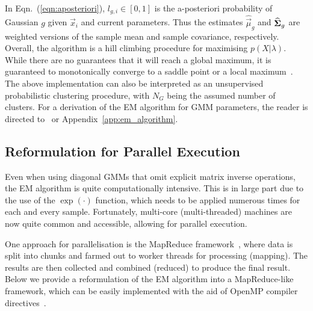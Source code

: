 \noindent In Eqn.~(\ref{eqn:aposteriori}), $l_{g,i} \in [0,1]$ is the {a-posteriori} probability of Gaussian $g$ given $\Vec{x}_i$ and current parameters.
Thus the estimates $\widehat{\Vec{\mu}}_g$ and $\widehat{{\boldsymbol{\Sigma}}}_g$ are weighted versions of the
sample mean and sample covariance, respectively.
Overall, the algorithm is a hill climbing procedure for maximising $p(X | \lambda)$.
While there are no guarantees that it will reach a global maximum, it is guaranteed to monotonically converge to a saddle point or a local maximum~\cite{Dempster77,Duda01,Mitchell97}.
The above implementation can also be interpreted as an unsupervised probabilistic clustering procedure,
with $N_G$ being the assumed number of clusters.
For a derivation of the EM algorithm for GMM parameters, the reader is directed to~\cite{Bilmes98,Redner84} or Appendix~\ref{app:em_algorithm}.


\subsection{Reformulation for Parallel Execution}

Even when using diagonal GMMs that omit explicit matrix inverse operations, the EM algorithm is quite computationally intensive.
This is in large part due to the use of the $\exp(\cdot)$ function, which needs to be applied numerous times for each and every sample.
Fortunately, multi-core (multi-threaded) machines are now quite common and accessible, allowing for parallel execution.

One approach for parallelisation is the MapReduce framework~\cite{MapReduce_2004},
where data is split into chunks and farmed out to worker threads for processing (mapping).
The results are then collected and combined (reduced) to produce the final result.
Below we provide a reformulation of the EM algorithm into a MapReduce-like framework,
which can be easily implemented with the aid of OpenMP compiler directives~\cite{OpenMP_2007}.

